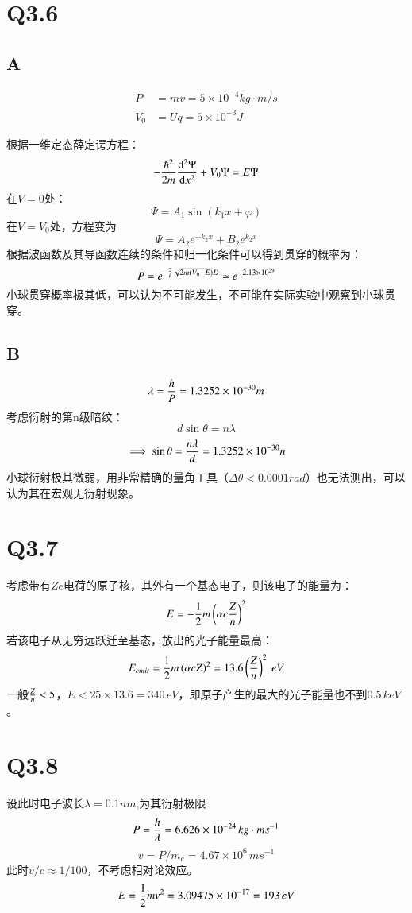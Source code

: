 \documentclass[UTF8,9pt]{ctexart}
\begin{document}
            
    \section{Q3.6}
        \subsection{A}
            $$\begin{array}{rll}
                P&=mv=5\times 10^{-4} kg\cdot m /s\\
                V_0&=Uq=5\times 10^{-3} J
            \end{array}$$

            根据一维定态薛定谔方程：
            $$-\frac{\hbar^2}{2m}\frac{\mathrm{d} ^2 \Psi}{\mathrm{d} x^2}+V_0\Psi=E\Psi$$
            在$V=0$处：
            $$\Psi=A_1\sin(k_1x+\varphi)$$
            在$V=V_0$处，方程变为
            $$\Psi=A_2e^{-k_2x}+B_2e^{k_2x}$$
            根据波函数及其导函数连续的条件和归一化条件可以得到贯穿的概率为：
            $$P=e^{-\frac{2}{h}\sqrt{2m(V_0-E)}D} \simeq e^{-2.13\times10^{29}}$$
            小球贯穿概率极其低，可以认为不可能发生，不可能在实际实验中观察到小球贯穿。
        \subsection{B}
        $$\lambda=\frac{h}{P}=1.3252\times 10^{-30}m$$
        考虑衍射的第n级暗纹：
        $$d\sin\theta=n\lambda$$
        $$\implies \sin\theta=\frac{n\lambda}{d}=1.3252\times 10^{-30}n$$
        小球衍射极其微弱，用非常精确的量角工具（$\Delta\theta<0.0001rad$）也无法测出，可以认为其在宏观无衍射现象。
    \section{Q3.7}
        考虑带有$Ze$电荷的原子核，其外有一个基态电子，则该电子的能量为：
        $$E=-\frac{1}{2}m\left(\alpha c\frac{Z}{n}\right)^2$$
        若该电子从无穷远跃迁至基态，放出的光子能量最高：
        $$E_{emit}=\frac{1}{2}m\left(\alpha cZ\right)^2=13.6\left(\frac{Z}{n}\right)^2 \ eV$$
        一般$\frac{Z}{n}<5$，$E<25\times 13.6=340\, eV$，即原子产生的最大的光子能量也不到$0.5\,keV$。
    \section{Q3.8}
        设此时电子波长$\lambda=0.1nm$,为其衍射极限
        $$P=\frac{h}{\lambda}=6.626\times10^{-24}\,kg\cdot m s^{-1}$$
        $$v=P/m_e=4.67\times 10^6 \,m s^{-1}$$
        此时$v/c \approx 1/100$，不考虑相对论效应。
        $$E=\frac{1}{2}mv^2=3.09475\times10^{-17}=193\, eV$$
\end{document}
